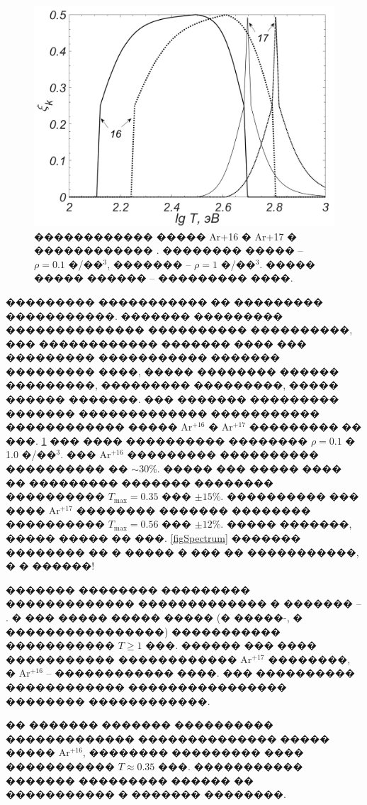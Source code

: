 \documentclass[12pt,titlepage]{article}
\begin{document}
\begin{figure}[h!]
\centerline{
\includegraphics[width=0.7\linewidth]{Detailed_compound.png}
}
\caption{������������ ����� Ar+16 � Ar+17 � ������������ \cite{Hooper1988}. �������� ����� -- $\rho = 0.1$ �/��$^3$, ������� -- $\rho = 1$ �/��$^3$. ����� ����� ������ -- ��������� ����.} \label{figDetailedCompound}
\end{figure}

��������� ����������� �� ��������� �����������. ������� ��������� �������������� ���������� ����������, ��� ������������ ������� ���� ��� ��������� ����������� ������� ��������� ����, ����� �������� ������ ���������, ��������� ���������, ����� ������ �������. ��� ������� ��������� ������� ������������� ����������� ������������ ����� Ar$^{+16}$ � Ar$^{+17}$ ��������� �� ���. \ref{figDetailedCompound} ��� ���� ���������� �������� $\rho = 0.1$ � 1.0 �/��$^3$. ��� Ar$^{+16}$ ��������� ���������� ���������� �� $\sim$30\%.
����� ��� ����� ���� �� ��������� ������� �������� ���������� $T_{\max} = 0.35$ ��� $\pm15$\%.
���������� ��� ���� Ar$^{+17}$ �������� ������� �������� ���������� $T_{\max} = 0.56$ ��� $\pm12$\%.
����� �������, ����� ����� �� ���. \ref{figSpectrum} ������� �������� �� � ����� � ��� �� �����������, � � ������!

������� �������� ��������� ������������� ������������� � ������� \cite{Delamater1985} -- \cite{Florido2014}. � ��� ����� ����� ����� (� �����-, � ����������������) ����������� ����������� $T \geq 1$ ���. ������ ��� ���� ����������� ������������ Ar$^{+17}$ ��������, � Ar$^{+16}$ -- ������������ ����. ��� ���������� ������������ ���������������� �������� ������������.

�� ������� ������� ���������� ������������� �������������� ����� ����� Ar$^{+16}$, �������� ��������� ���� ����������� $T \approx 0.35$ ���. ����������� ������� ��������� ������ �� ����������� � ������� ��������.
\end{document}
